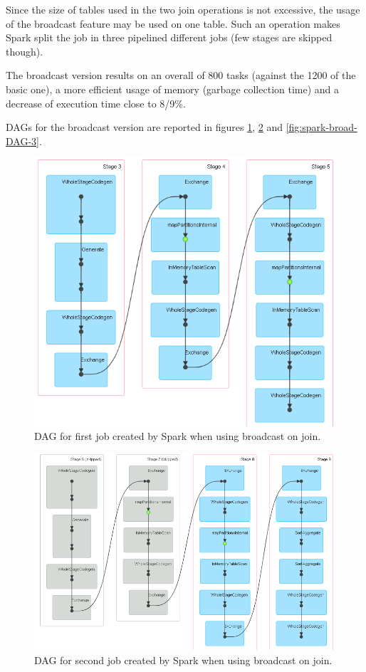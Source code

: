 Since the size of tables used in the two join operations is not excessive, the usage of the broadcast feature may be used on one table. Such an operation makes Spark split the job in three pipelined different jobs (few stages are skipped though).

The broadcast version results on an overall of 800 tasks (against the 1200 of the basic one), a more efficient usage of memory (garbage collection time) and a decrease of execution time close to 8/9\%.

DAGs for the broadcast version are reported in figures \ref{fig:sspark-broad-DAG-1}, \ref{fig:spark-broad-DAG-2} and \ref{fig:spark-broad-DAG-3}.

\begin{figure}[H]
	\centering
	\includegraphics[scale=0.8]{images/3-spark/broad-DAG-1.png}
	\caption{DAG for first job created by Spark when using broadcast on join.}
	\label{fig:sspark-broad-DAG-1}
\end{figure}


\begin{figure}[H]
	\centering
	\includegraphics[scale=0.65]{images/3-spark/broad-DAG-2.png}
	\caption{DAG for second job created by Spark when using broadcast on join.}
	\label{fig:spark-broad-DAG-2}
\end{figure}


